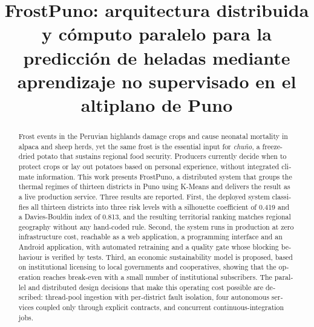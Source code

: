 \documentclass[conference]{IEEEtran}
\begin{document}
\title{FrostPuno: arquitectura distribuida y c\'omputo paralelo para la
predicci\'on de heladas mediante aprendizaje no supervisado en el altiplano
de Puno}

\author{
}

\maketitle

\renewcommand{\abstractname}{Abstract}
\begin{abstract}
\begin{otherlanguage}{english}
Frost events in the Peruvian highlands damage crops and cause neonatal mortality
in alpaca and sheep herds, yet the same frost is the essential input for
\emph{chu\~no}, a freeze-dried potato that sustains regional food security.
Producers currently decide when to protect crops or lay out potatoes based on
personal experience, without integrated climate information. This work presents
FrostPuno, a distributed system that groups the thermal regimes of thirteen
districts in Puno using K-Means and delivers the result as a live production
service. Three results are reported. First, the deployed system classifies all
thirteen districts into three risk levels with a silhouette coefficient of 0.419
and a Davies-Bouldin index of 0.813, and the resulting territorial ranking
matches regional geography without any hand-coded rule. Second, the system runs
in production at zero infrastructure cost, reachable as a web application, a
programming interface and an Android application, with automated retraining and
a quality gate whose blocking behaviour is verified by tests. Third, an economic
sustainability model is proposed, based on institutional licensing to local
governments and cooperatives, showing that the operation reaches break-even with
a small number of institutional subscribers. The parallel and distributed design
decisions that make this operating cost possible are described: thread-pool
ingestion with per-district fault isolation, four autonomous services coupled
only through explicit contracts, and concurrent continuous-integration jobs.
\end{otherlanguage}
\end{abstract}
\end{document}
